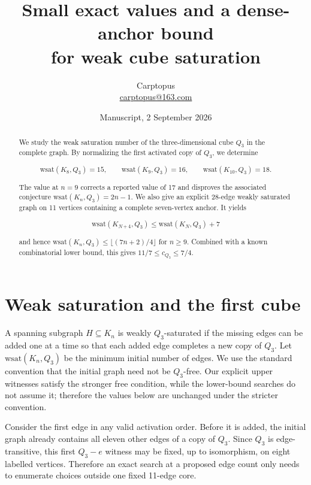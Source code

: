 \documentclass[11pt]{article}
\title{Small exact values and a dense-anchor bound\\for weak cube saturation}
\author{Carptopus\\\href{mailto:carptopus@163.com}{carptopus@163.com}}
\date{Manuscript, 2 September 2026}
\numberwithin{equation}{section}
\begin{document}
\maketitle

\begin{center}
\end{center}

\begin{abstract}


We study the weak saturation number of the three-dimensional cube $Q_3$ in the complete graph. By
normalizing the first activated copy of $Q_3$, we determine

\[
\mathrm{wsat}(K_8,Q_3)=15,\qquad
\mathrm{wsat}(K_9,Q_3)=16,\qquad
\mathrm{wsat}(K_{10},Q_3)=18.
\]

The value at $n=9$ corrects a reported value of 17 and disproves the associated conjecture
$\mathrm{wsat}(K_n,Q_3)=2n-1$. We also give an explicit 28-edge weakly saturated graph on 11
vertices containing a complete seven-vertex anchor. It yields

\[
\mathrm{wsat}(K_{N+4},Q_3)\leq\mathrm{wsat}(K_N,Q_3)+7
\]

and hence $\mathrm{wsat}(K_n,Q_3)\leq\lfloor(7n+2)/4\rfloor$ for $n\geq9$. Combined with a
known combinatorial lower bound, this gives $11/7\leq c_{Q_3}\leq7/4$.

\end{abstract}

\section{Weak saturation and the first cube}


A spanning subgraph $H\subseteq K_n$ is weakly $Q_3$-saturated if the missing edges can be added
one at a time so that each added edge completes a new copy of $Q_3$. Let
$\mathrm{wsat}(K_n,Q_3)$ be the minimum initial number of edges.
We use the standard convention that the initial graph need not be $Q_3$-free. Our explicit upper
witnesses satisfy the stronger free condition, while the lower-bound searches do not assume it;
therefore the values below are unchanged under the stricter convention.

Consider the first edge in any valid activation order. Before it is added, the initial graph already
contains all eleven other edges of a copy of $Q_3$. Since $Q_3$ is edge-transitive, this first
$Q_3-e$ witness may be fixed, up to isomorphism, on eight labelled vertices. Therefore an exact
search at a proposed edge count only needs to enumerate choices outside one fixed 11-edge core.
\end{document}

